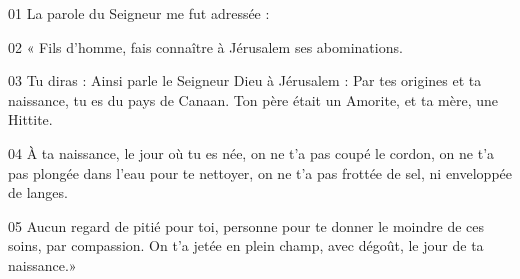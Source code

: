 01 La parole du Seigneur me fut adressée :

02 « Fils d’homme, fais connaître à Jérusalem ses abominations.

03 Tu diras : Ainsi parle le Seigneur Dieu à Jérusalem : Par tes origines et ta naissance, tu es du pays de Canaan. Ton père était un Amorite, et ta mère, une Hittite.

04 À ta naissance, le jour où tu es née, on ne t’a pas coupé le cordon, on ne t’a pas plongée dans l’eau pour te nettoyer, on ne t’a pas frottée de sel, ni enveloppée de langes.

05 Aucun regard de pitié pour toi, personne pour te donner le moindre de ces soins, par compassion. On t’a jetée en plein champ, avec dégoût, le jour de ta naissance.»